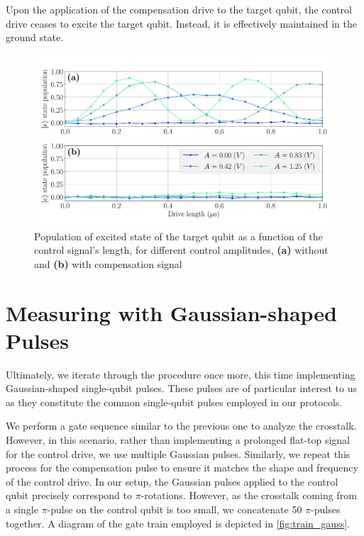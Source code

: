 Upon the application of the compensation drive to the target qubit, the control drive ceases to excite the target qubit.
Instead, it is effectively maintained in the ground state.

\begin{figure}
    \centering
    \includegraphics[width=1\linewidth]{Images//Chap2.0/Raby_flattop_cancellation.pdf}
    \vspace{-0.8cm}
    \caption{Population of excited state of the target qubit as a function of the control signal's length, for different control amplitudes, \textbf{(a)} without and \textbf{(b)} with compensation signal}
    \label{fig:Rabi_flattop_canc}
\end{figure}

\section{Measuring with Gaussian-shaped Pulses}
\label{sec:gaussian_shaped}

Ultimately, we iterate through the procedure once more, this time implementing Gaussian-shaped single-qubit pulses.
These pulses are of particular interest to us as they constitute the common single-qubit pulses employed in our protocols.

We perform a gate sequence similar to the previous one to analyze the crosstalk.
However, in this scenario, rather than implementing a prolonged flat-top signal for the control drive, we use multiple Gaussian pulses.
Similarly, we repeat this process for the compensation pulse to ensure it matches the shape and frequency of the control drive. 
In our setup, the Gaussian pulses applied to the control qubit precisely correspond to $\pi$-rotations.
However, as the crosstalk coming from a single $\pi$-pulse on the control qubit is too small, we concatenate 50 $\pi$-pulses together.
A diagram of the gate train employed is depicted in \cref{fig:train_gauss}.

